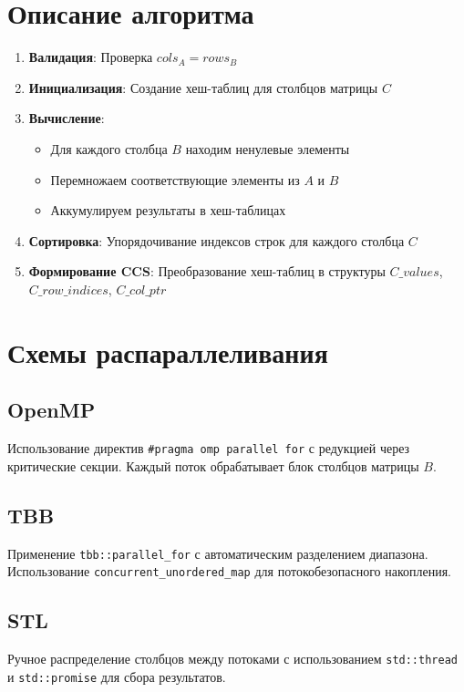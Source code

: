 \documentclass[a4paper,12pt]{article}
\begin{document}
\section{Описание алгоритма}
\begin{enumerate}
\item \textbf{Валидация}: Проверка \( cols_A = rows_B \)
\item \textbf{Инициализация}: Создание хеш-таблиц для столбцов матрицы \( C \)
\item \textbf{Вычисление}:
\begin{itemize}
\item Для каждого столбца \( B \) находим ненулевые элементы
\item Перемножаем соответствующие элементы из \( A \) и \( B \)
\item Аккумулируем результаты в хеш-таблицах
\end{itemize}
\item \textbf{Сортировка}: Упорядочивание индексов строк для каждого столбца \( C \)
\item \textbf{Формирование CCS}: Преобразование хеш-таблиц в структуры \( C\_values \), \( C\_row\_indices \), \( C\_col\_ptr \)
\end{enumerate}

\section{Схемы распараллеливания}
\subsection{OpenMP}
Использование директив \texttt{\#pragma omp parallel for} с редукцией через критические секции. Каждый поток обрабатывает блок столбцов матрицы \( B \).

\subsection{TBB}
Применение \texttt{tbb::parallel\_for} с автоматическим разделением диапазона. Использование \texttt{concurrent\_unordered\_map} для потокобезопасного накопления.

\subsection{STL}
Ручное распределение столбцов между потоками с использованием \texttt{std::thread} и \texttt{std::promise} для сбора результатов.
\end{document}
